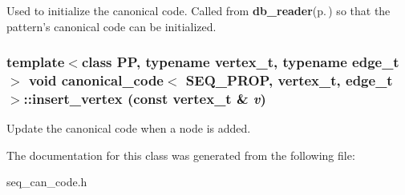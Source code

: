 Used to initialize the canonical code. Called from {\bf db\_\-reader}{\rm (p.\,\pageref{classdb__reader})} so that the pattern's canonical code can be initialized. 
\subsubsection{\setlength{\rightskip}{0pt plus 5cm}template$<$class PP, typename vertex\_\-t, typename edge\_\-t$>$ void {\bf canonical\_\-code}$<$ SEQ\_\-PROP, vertex\_\-t, edge\_\-t $>$::insert\_\-vertex (const vertex\_\-t \& {\em v})\hspace{0.3cm}{\tt  [inline]}}\label{classcanonical__code_3_01SEQ__PROP_00_01vertex__t_00_01edge__t_01_4_a2}


Update the canonical code when a node is added. 

The documentation for this class was generated from the following file:\begin{CompactItemize}
\item 
seq\_\-can\_\-code.h\end{CompactItemize}
